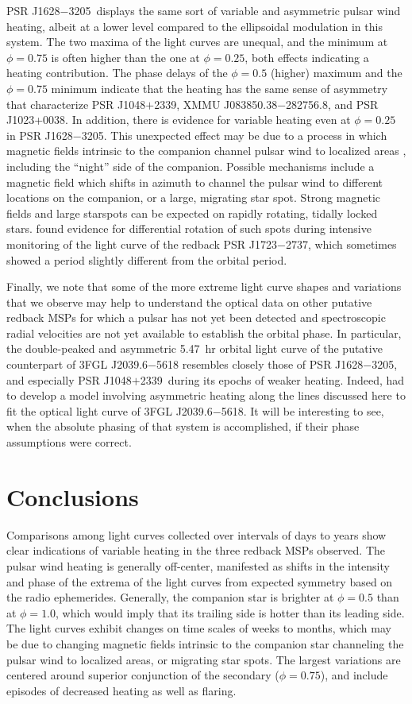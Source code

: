 \documentclass[iop]{emulateapj}
\newcommand{\mspone}{PSR J1628$-$3205}
\newcommand{\msptwo}{PSR J1048$+$2339}
\newcommand{\mspthree}{XMMU J083850.38$-$282756.8}
\begin{document}
\mspone\ displays the same sort of variable and asymmetric pulsar wind heating,
albeit at a lower level compared to the ellipsoidal modulation in this system.
The two maxima of the light curves are unequal, and the minimum at $\phi=0.75$ is
often higher than the one at $\phi=0.25$, both effects indicating a heating
contribution.  The phase delays of the $\phi=0.5$ (higher) maximum and the
$\phi=0.75$ minimum indicate that the heating has the same sense of asymmetry
that characterize \msptwo, \mspthree, and PSR J1023+0038.  In addition, there
is evidence for variable heating even at $\phi=0.25$ in \mspone.
This unexpected effect may be due to a process in which magnetic fields
intrinsic to the companion channel pulsar wind to localized areas \citep{san17},
including the ``night'' side of the companion.  Possible mechanisms include
a magnetic field which shifts in azimuth to channel the pulsar wind to 
different locations on the companion, or a large, migrating star spot.
Strong magnetic fields and large starspots can be expected on rapidly
rotating, tidally locked stars.  \citet{van16} found evidence for
differential rotation
of such spots during intensive monitoring of the light curve of the redback
PSR J1723$-$2737, which sometimes showed a period slightly different
from the orbital period.

Finally, we note that some of the more extreme light curve shapes and
variations that we observe may help to understand the optical data on other putative
redback MSPs for which a pulsar has not yet been detected and spectroscopic
radial velocities are not yet available to establish the orbital phase.
In particular, the double-peaked and asymmetric 5.47~hr orbital light curve of
the putative counterpart of 3FGL J2039.6$-$5618 \citep{rom15a,sal15} resembles
closely those of \mspone, and especially \msptwo\ during its epochs of weaker heating.
Indeed, \citet{sal15} had to develop a model involving asymmetric heating
along the lines discussed here to fit the optical light curve of 3FGL J2039.6$-$5618.
It will be interesting to see, when the absolute phasing of that system is accomplished,
if their phase assumptions were correct.

\section{Conclusions}

Comparisons among light curves collected over intervals of days to years 
show clear indications of variable heating in the three redback MSPs
observed.  The pulsar wind heating is generally off-center, manifested
as shifts in the intensity and phase of the extrema of the light curves
from expected symmetry based on the radio ephemerides.
Generally, the companion star is brighter at $\phi=0.5$ than at
$\phi=1.0$, which would imply that its trailing side is hotter
than its leading side.  The light curves
exhibit changes on time scales of weeks to months, which may be due
to changing magnetic fields intrinsic to the companion star channeling 
the pulsar wind to localized areas, or migrating star spots. 
The largest variations are centered around superior conjunction
of the secondary ($\phi=0.75$), and include episodes of decreased
heating as well as flaring. 
\end{document}
